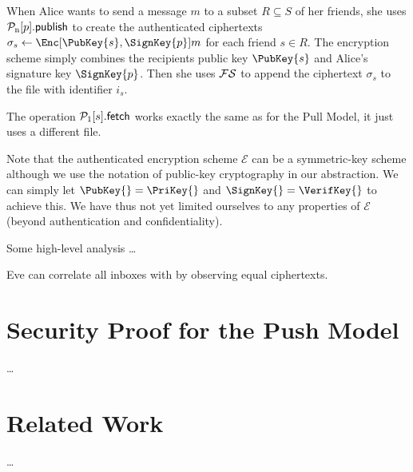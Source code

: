 When Alice wants to send a message \(m\) to a subset \(R\subseteq S\) of her 
friends, she uses \(\pnpub{p}\) to create the authenticated ciphertexts 
\(\sigma_s\gets \Enc[\PubKey{s}, \SignKey{p}]{m}\) for each friend \(s\in R\).
The encryption scheme simply combines the recipients public key \(\PubKey{s}\) 
and Alice's signature key \(\SignKey{p}\).
Then she uses \(\FS\) to append the ciphertext \(\sigma_s\) to the file with 
identifier \(i_s\).

The operation \(\pget{s}\) works exactly the same as for the Pull Model, it 
just uses a different file.

Note that the authenticated encryption scheme \(\mathcal{E}\) can be 
a symmetric-key scheme although we use the notation of public-key cryptography 
in our abstraction.
We can simply let \(\PubKey{} = \PriKey{}\) and \(\SignKey{} = \VerifKey{}\) to 
achieve this.
We have thus not yet limited ourselves to any properties of \(\mathcal{E}\) 
(beyond authentication and confidentiality).

Some high-level analysis \dots

Eve can correlate all inboxes with by observing equal ciphertexts.

\section{Security Proof for the Push Model}

\dots


\section{Related Work}

\dots



